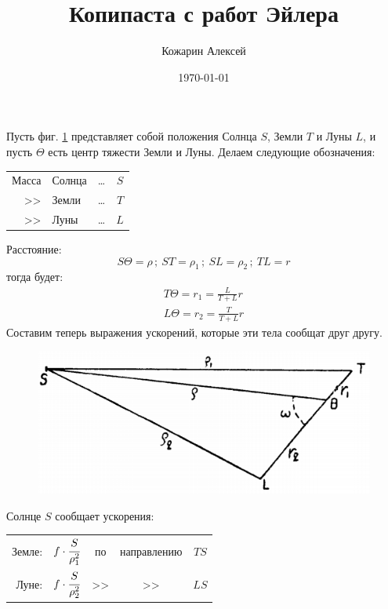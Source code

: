 \documentclass[a4paper,12pt]{article}
\author{Кожарин Алексей}
\title{Копипаста с работ Эйлера}
\date{\today}
\begin{document}
	\maketitle
	\section{}
	Пусть фиг. \ref{fig21} представляет собой положения Солнца $S$, Земли $T$ и Луны $L$, и пусть $\Theta$ есть центр тяжести Земли и Луны. Делаем следующие обозначения:
	
	\begin{table}[h]
		\begin{center}
			\begin{tabular}{rlcc}
				Масса & Солнца & \dots & $S$ \\
				>> & Земли & \dots & $T$ \\
				>> & Луны & \dots & $L$
			\end{tabular}
		\end{center}
	\end{table}

	Расстояние:
	\[
	S \Theta = \rho\,;~ ST = \rho_1\,;~ SL = \rho_2\,;~ TL = r
	\]
	тогда будет:
	\begin{equation}
	\label{eq1}
		\begin{aligned}
			T \Theta = r_1 = \frac{L}{T+L} r \\
			L \Theta = r_2 = \frac{T}{T+L} r
		\end{aligned}
	\end{equation}
	Составим теперь выражения ускорений, которые эти тела сообщат друг другу.
	\begin{figure}[!h]
		\centering
		\label{fig21}
		\caption{}
		\includegraphics[width=0.45\linewidth]{fig21}
	\end{figure}

	Солнце $S$ сообщает ускорения:
	\begin{table}[!h]
		\centering
		\begin{tabular}{rcccc}
			Земле: & $f \cdot \cfrac{S}{\rho_1^2}$ & по & направлению & $TS$ \\[5mm]
			Луне: & $f \cdot \cfrac{S}{\rho_2^2}$ & >> & >>  & $LS$
		\end{tabular}
	\end{table}
\end{document}
